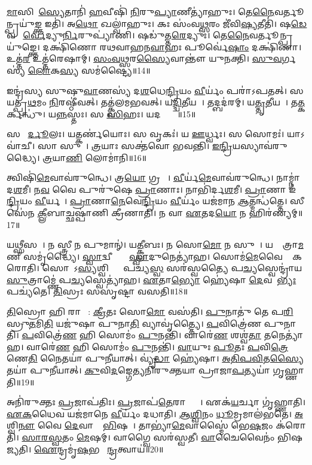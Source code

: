 \ul{𑌮𑌾}𑌸𑌿𑌮𑌾᳚\ul{𑌸𑍍𑌯𑍇}𑌤𑌾𑌨𑌿॑ \ul{𑌹}𑌵𑍀𑌷𑌿॑ \ul{𑌨𑌿}𑌰𑍁\ul{𑌪𑍍𑌯𑌾}𑌣𑍀𑌤𑍍𑌯𑌾॑𑌹𑍁𑌃।
𑌤𑍇\ul{𑌨𑍈}𑌵𑌰𑍍𑌤𑍂𑌨𑍍𑌪𑍍𑌰𑌯𑍁॑\ul{𑌙𑍍𑌕𑍍𑌤} 𑌇𑌤𑌿॑।
𑌅\ul{𑌥𑍋} 𑌖𑌲𑍍𑌵𑌾॑𑌹𑍁𑌃।
𑌕𑌃 𑌸𑌂॑𑌵\ul{𑌥𑍍𑌸}𑌰𑌂 𑌜𑍀॑𑌵𑌿\ul{𑌷𑍍𑌯}𑌤𑍀𑌤𑌿॑।
𑌷\ul{𑌡𑍇}𑌵 𑌪𑍂᳚\ul{𑌰𑍍𑌵𑍇}𑌦𑍍𑌯𑍁\ul{𑌰𑍍𑌨𑌿}𑌰𑍁𑌪𑍍𑌯𑌾॑𑌣𑌿।
𑌷𑌡𑍁॑𑌤𑍍𑌤\ul{𑌰𑍇}𑌦𑍍𑌯𑍁𑌃।
𑌤𑍇\ul{𑌨𑍈}𑌵𑌰𑍍𑌤𑍂𑌨𑍍𑌪𑍍𑌰𑌯𑍁॑𑌙𑍍𑌕𑍍𑌤𑍇।
𑌦𑌕𑍍𑌷𑌿॑𑌣𑍋 𑌰𑌥𑌵𑌾𑌹𑌨\ul{𑌵𑌾}𑌹𑌃 𑌪𑍂𑌰𑍍𑌵𑍇॑\ul{𑌷𑌾𑌂} 𑌦𑌕𑍍𑌷𑌿॑𑌣𑌾।
𑌉𑌤𑍍𑌤॑\ul{𑌰} 𑌉𑌤𑍍𑌤॑𑌰𑍇𑌷𑌾𑌮𑍍।
\ul{𑌸𑌂}\ul{𑌵}\ul{𑌥𑍍𑌸}𑌰\ul{𑌸𑍍𑌯𑍈}𑌵𑌾𑌨𑍍𑌤𑍗॑ 𑌯𑍁𑌨𑌕𑍍𑌤𑌿।
\ul{𑌸𑍁}\ul{𑌵}𑌰𑍍𑌗𑌸𑍍𑌯॑ \ul{𑌲𑍋}𑌕\ul{𑌸𑍍𑌯} 𑌸𑌮॑𑌷𑍍𑌟𑍍𑌯𑍈॥14॥\anuvakamend[\ul{𑌤𑍍𑌵𑌾}𑌷𑍍𑌟𑍍𑌰\ul{𑌮}𑌷𑍍𑌟𑌾𑌕॑𑌪𑌾𑌲𑌂 𑌦𑌧𑌤𑍇 𑌯𑍁\ul{𑌨}𑌕𑍍𑌤𑍍𑌯𑍇𑌕𑌂॑ 𑌚]

𑌇𑌨𑍍𑌦𑍍𑌰॑𑌸𑍍𑌯 𑌸𑍁𑌷𑍁\ul{𑌵𑌾}𑌣𑌸𑍍𑌯॑ 𑌦\ul{𑌶}𑌧𑍇\ul{𑌨𑍍𑌦𑍍𑌰𑌿}𑌯𑌂 \ul{𑌵𑍀}𑌰𑍍𑌯𑌂॑ 𑌪𑌰𑌾॑\-𑌽𑌪𑌤𑌤𑍍।
𑌸 𑌯𑌤𑍍𑌪𑍍𑌰॑\ul{𑌥}𑌮𑌂 \ul{𑌨𑌿}𑌰𑌷𑍍𑌠𑍀॑𑌵𑌤𑍍।
𑌤𑌤𑍍𑌕𑍍𑌵॑𑌲𑌮𑌭𑌵𑌤𑍍।
𑌯\ul{𑌦𑍍𑌦𑍍𑌵𑌿}𑌤𑍀𑌯𑌮𑍍᳚।
𑌤𑌦𑍍𑌬𑌦॑𑌰𑌮𑍍।
𑌯\ul{𑌤𑍍𑌤𑍃}𑌤𑍀𑌯𑌮𑍍᳚।
𑌤\ul{𑌤𑍍𑌕}𑌰𑍍𑌕𑌨𑍍𑌧𑍁॑।
𑌯\ul{𑌨𑍍𑌨}𑌸𑍍𑌤𑌃।
𑌸 \ul{𑌸𑌿}\ul{}𑌹𑌃।
𑌯𑌦𑌕𑍍𑌷𑍍𑌯𑍋𑌃᳚॥15॥

𑌸 𑌶𑌾᳚\ul{𑌰𑍍𑌦𑍂}𑌲𑌃।
𑌯𑌤𑍍𑌕𑌰𑍍𑌣॑𑌯𑍋𑌃।
𑌸 𑌵𑍃𑌕𑌃॑।
𑌯 \ul{𑌊}𑌰𑍍𑌧𑍍𑌵𑌃।
𑌸 𑌸𑍋𑌮𑌃॑।
𑌯𑌾𑌽𑌵𑌾॑𑌚𑍀।
𑌸𑌾 𑌸𑍁𑌰𑌾᳚।
\ul{𑌤𑍍𑌰}𑌯𑌾𑌃 𑌸𑌕𑍍𑌤॑𑌵𑍋 𑌭𑌵𑌨𑍍𑌤𑌿।
\ul{𑌇}\ul{𑌨𑍍𑌦𑍍𑌰𑌿}𑌯𑌸𑍍𑌯𑌾𑌵॑𑌰𑍁𑌦𑍍𑌧𑍍𑌯𑍈।
\ul{𑌤𑍍𑌰}𑌯𑌾\ul{𑌣𑌿} 𑌲𑍋𑌮𑌾॑𑌨𑌿॥16॥

𑌤𑍍𑌵𑌿𑌷𑌿॑\ul{𑌮𑍇}𑌵𑌾𑌵॑𑌰𑍁𑌨𑍍𑌧𑍇।
𑌤𑍍𑌰\ul{𑌯𑍋} 𑌗𑍍𑌰𑌹𑌾𑌃᳚।
\ul{𑌵𑍀}𑌰𑍍𑌯॑\ul{𑌮𑍇}𑌵𑌾𑌵॑𑌰𑍁𑌨𑍍𑌧𑍇।
𑌨𑌾𑌮𑍍𑌨𑌾॑ 𑌦\ul{𑌶}𑌮𑍀।
𑌨\ul{𑌵} 𑌵𑍈 𑌪𑍁𑌰𑍁॑𑌷𑍇 \ul{𑌪𑍍𑌰𑌾}𑌣𑌾𑌃।
𑌨𑌾𑌭𑌿॑𑌰𑍍𑌦\ul{𑌶}𑌮𑍀।
\ul{𑌪𑍍𑌰𑌾}𑌣𑌾 𑌇॑\ul{𑌨𑍍𑌦𑍍𑌰𑌿}𑌯𑌂 \ul{𑌵𑍀}𑌰𑍍𑌯𑌮𑍍᳚।
\ul{𑌪𑍍𑌰𑌾}𑌣𑌾\ul{𑌨𑍇}𑌵𑍇\ul{𑌨𑍍𑌦𑍍𑌰𑌿}𑌯𑌂 \ul{𑌵𑍀}𑌰𑍍𑌯𑌂॑ 𑌯𑌜॑𑌮𑌾𑌨 \ul{𑌆}𑌤𑍍𑌮𑌨𑍍𑌧॑𑌤𑍍𑌤𑍇।
𑌸𑍀𑌸𑍇॑𑌨 \ul{𑌕𑍍𑌲𑍀}𑌬𑌾𑌚𑍍𑌛𑌷𑍍𑌪𑌾॑𑌣𑌿 𑌕𑍍𑌰𑍀𑌣𑌾𑌤𑌿।
𑌨 𑌵𑌾 \ul{𑌏}𑌤𑌦\ul{𑌯𑍋} 𑌨 𑌹𑌿𑌰॑𑌣𑍍𑌯𑌮𑍍॥17॥

𑌯𑌥𑍍𑌸𑍀𑌸𑌮𑍍᳚।
𑌨 𑌸𑍍𑌤𑍍𑌰𑍀 𑌨 𑌪𑍁𑌮𑌾𑌨𑍍॑।
𑌯\ul{𑌤𑍍𑌕𑍍𑌲𑍀}𑌬𑌃।
𑌨 𑌸𑍋\ul{𑌮𑍋} 𑌨 𑌸𑍁𑌰𑌾᳚।
𑌯𑌥𑍍𑌸𑍗᳚𑌤𑍍𑌰𑌾\ul{𑌮}𑌣𑍀 𑌸𑌮𑍃॑𑌦𑍍𑌧𑍍𑌯𑍈।
\ul{𑌸𑍍𑌵𑌾}𑌦𑍍𑌵𑍀𑌨𑍍𑌤𑍍𑌵𑌾᳚ \ul{𑌸𑍍𑌵𑌾}𑌦𑍁𑌨𑍇𑌤𑍍𑌯𑌾॑𑌹।
𑌸𑍋𑌮॑\ul{𑌮𑍇}𑌵𑍈𑌨𑌾𑌂᳚ 𑌕𑌰𑍋𑌤𑌿।
𑌸𑍋𑌮𑍋᳚\-𑌽\ul{𑌸𑍍𑌯}𑌶𑍍𑌵𑌿𑌭𑍍𑌯𑌾𑌂᳚ 𑌪𑌚𑍍𑌯\ul{𑌸𑍍𑌵} 𑌸𑌰॑𑌸𑍍𑌵𑌤𑍍𑌯𑍈 𑌪\ul{𑌚𑍍𑌯}𑌸𑍍𑌵𑍇𑌨𑍍𑌦𑍍𑌰𑌾॑𑌯 \ul{𑌸𑍁}𑌤𑍍𑌰𑌾𑌮𑍍𑌣𑍇॑ 𑌪\ul{𑌚𑍍𑌯}𑌸𑍍𑌵𑍇𑌤𑍍𑌯𑌾॑𑌹।
\ul{𑌏}𑌤𑌾\ul{𑌭𑍍𑌯𑍋} 𑌹𑍍𑌯𑍇॑𑌷𑌾 \ul{𑌦𑍇}𑌵𑌤𑌾᳚\ul{𑌭𑍍𑌯𑌃} 𑌪𑌚𑍍𑌯॑𑌤𑍇।
\ul{𑌤𑌿}𑌸𑍍𑌰𑌃 𑌸𑌸𑍃॑𑌷𑍍𑌟𑌾 𑌵𑌸𑌤𑌿॥18॥

\ul{𑌤𑌿}𑌸𑍍𑌰𑍋 𑌹𑌿 𑌰𑌾𑌤𑍍𑌰𑍀᳚: \ul{𑌕𑍍𑌰𑍀}𑌤𑌃 𑌸𑍋\ul{𑌮𑍋} 𑌵𑌸॑𑌤𑌿।
\ul{𑌪𑍁}𑌨𑌾𑌤𑍁॑ 𑌤𑍇 𑌪\ul{𑌰𑌿}𑌸𑍍𑌰𑍁\ul{𑌤}𑌮𑌿\ul{𑌤𑌿} 𑌯𑌜𑍁॑𑌷𑌾 𑌪𑍁𑌨𑌾\ul{𑌤𑌿} 𑌵𑍍𑌯𑌾𑌵𑍃॑𑌤𑍍𑌤𑍍𑌯𑍈।
\ul{𑌪}𑌵𑌿𑌤𑍍𑌰𑍇॑𑌣 𑌪𑍁𑌨𑌾𑌤𑌿।
\ul{𑌪}𑌵𑌿𑌤𑍍𑌰𑍇॑\ul{𑌣} 𑌹𑌿 𑌸𑍋𑌮𑌂॑ \ul{𑌪𑍁}𑌨𑌨𑍍𑌤𑌿॑।
𑌵𑌾𑌰𑍇॑\ul{𑌣} 𑌶𑌶𑍍𑌵॑\ul{𑌤𑌾} 𑌤𑌨𑍇𑌤𑍍𑌯𑌾॑𑌹।
𑌵𑌾𑌰𑍇॑\ul{𑌣} 𑌹𑌿 𑌸𑍋𑌮𑌂॑ \ul{𑌪𑍁}𑌨𑌨𑍍𑌤𑌿॑।
\ul{𑌵𑌾}𑌯𑍁𑌃 \ul{𑌪𑍂}𑌤𑌃 \ul{𑌪}𑌵𑌿\ul{𑌤𑍍𑌰𑍇}𑌣𑍇\ul{𑌤𑌿} 𑌨𑍈𑌤𑌯𑌾॑ 𑌪𑍁𑌨𑍀𑌯𑌾𑌤𑍍।
𑌵𑍍𑌯𑍃॑\ul{𑌦𑍍𑌧𑌾} 𑌹𑍍𑌯𑍇॑𑌷𑌾।
\ul{𑌅}\ul{𑌤𑌿}\ul{𑌪}\ul{𑌵𑌿}𑌤\ul{𑌸𑍍𑌯𑍈}𑌤𑌯𑌾॑ 𑌪𑍁𑌨𑍀𑌯𑌾𑌤𑍍।
\ul{𑌕𑍁}𑌵𑌿\ul{𑌦}𑌙𑍍𑌗𑍇𑌤𑍍𑌯𑌨𑌿॑𑌰𑍁𑌕𑍍𑌤𑌯𑌾 𑌪𑍍𑌰𑌾𑌜𑌾\ul{𑌪}𑌤𑍍𑌯𑌯𑌾॑ 𑌗𑍃𑌹𑍍𑌣𑌾𑌤𑌿॥19॥

𑌅𑌨𑌿॑𑌰𑍁𑌕𑍍𑌤𑌃 \ul{𑌪𑍍𑌰}𑌜𑌾𑌪॑𑌤𑌿𑌃।
\ul{𑌪𑍍𑌰}𑌜𑌾𑌪॑\ul{𑌤𑍇}𑌰𑌾𑌪𑍍𑌤𑍍𑌯𑍈᳚।
𑌏𑌕॑\ul{𑌯}𑌰𑍍𑌚𑌾 𑌗𑍃॑𑌹𑍍𑌣𑌾𑌤𑌿।
\ul{𑌏}\ul{𑌕}𑌧𑍈𑌵 𑌯𑌜॑𑌮𑌾𑌨𑍇 \ul{𑌵𑍀}𑌰𑍍𑌯𑌂॑ 𑌦𑌧𑌾𑌤𑌿।
\ul{𑌆}\ul{𑌶𑍍𑌵𑌿}𑌨𑌂 \ul{𑌧𑍂}𑌮𑍍𑌰𑌮𑌾𑌲॑𑌭𑌤𑍇।
\ul{𑌅}𑌶𑍍𑌵𑌿\ul{𑌨𑍗} 𑌵𑍈 \ul{𑌦𑍇}𑌵𑌾𑌨𑌾𑌂᳚ \ul{𑌭𑌿}𑌷𑌜𑍗᳚।
𑌤𑌾𑌭𑍍𑌯𑌾॑\ul{𑌮𑍇}𑌵𑌾𑌸𑍍𑌮𑍈॑ 𑌭𑍇\ul{𑌷}𑌜𑌂 𑌕॑𑌰𑍋𑌤𑌿।
\ul{𑌸𑌾}\ul{𑌰}\ul{𑌸𑍍𑌵}𑌤𑌂 \ul{𑌮𑍇}𑌷𑌮𑍍।
𑌵𑌾𑌗𑍍𑌵𑍈 𑌸𑌰॑𑌸𑍍𑌵𑌤𑍀।
\ul{𑌵𑌾}𑌚𑍈𑌵𑍈𑌨𑌂॑ 𑌭𑌿𑌷𑌜𑍍𑌯𑌤𑌿।
\ul{𑌐}𑌨𑍍𑌦𑍍𑌰𑌮𑍃॑\ul{𑌷}𑌭 𑌸𑍇᳚\ul{𑌨𑍍𑌦𑍍𑌰}𑌤𑍍𑌵𑌾𑌯॑॥20॥\anuvakamend[𑌅\ul{𑌕𑍍𑌷𑍍𑌯𑍋}𑌰𑍍𑌲𑍋𑌮𑌾॑\ul{𑌨𑌿} 𑌹𑌿𑌰॑𑌣𑍍𑌯𑌂 𑌵𑌸𑌤𑌿 𑌗𑍃𑌹𑍍𑌣𑌾𑌤𑌿 𑌭𑌿𑌷\ul{𑌜𑍍𑌯}𑌤𑍍𑌯𑍇𑌕𑌂॑ 𑌚]


